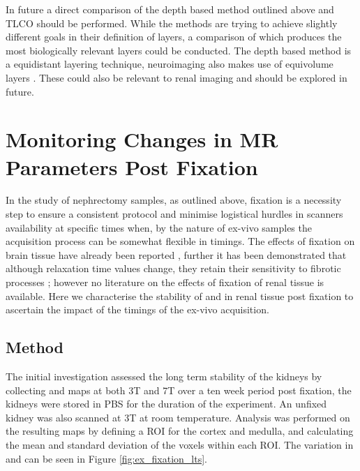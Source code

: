 In future a direct comparison of the depth based method outlined above and \ac{TLCO} should be performed. While the methods are trying to achieve slightly different goals in their definition of layers, a comparison of which produces the most biologically relevant layers could be conducted. The depth based method is a equidistant layering technique, neuroimaging also makes use of equivolume layers \cite{waehnert_anatomically_2014}. These could also be relevant to renal imaging and should be explored in future.

\section{Monitoring Changes in MR Parameters Post Fixation}
\label{sec:ex_tissue_fixation}
In the study of nephrectomy samples, as outlined above, fixation is a necessity step to ensure a consistent protocol and minimise logistical hurdles in scanners availability at specific times when, by the nature of ex-vivo samples the acquisition process can be somewhat flexible in timings. The effects of fixation on brain tissue have already been reported \cite{birkl_effects_2016, schmierer_quantitative_2008, shatil_quantitative_2018}, further it has been demonstrated that although relaxation time values change, they retain their sensitivity to fibrotic processes \cite{jafari_integrated_2021}; however no literature on the effects of fixation of renal tissue is available. Here we characterise the stability of \tone and \ttwostar in renal tissue post fixation to ascertain the impact of the timings of the ex-vivo acquisition.

\subsection{Method}
The initial investigation assessed the long term stability of the kidneys by collecting \tone and \ttwostar maps at both 3T and 7T over a ten week period post fixation, the kidneys were stored in \ac{PBS} for the duration of the experiment. An unfixed kidney was also scanned at 3T at room temperature. Analysis was performed on the resulting maps by defining a \ac{ROI} for the cortex and medulla, and calculating the mean and standard deviation of the voxels within each \ac{ROI}. The variation in \tone and \ttwostar can be seen in Figure \ref{fig:ex_fixation_lts}. 

